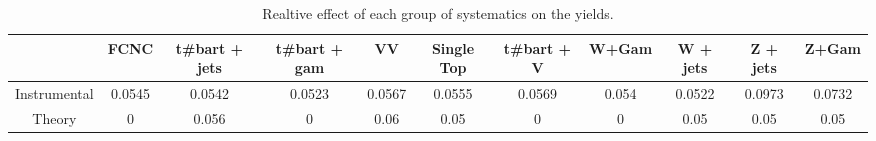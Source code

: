 \begin{table}[htbp]
\begin{center}
\begin{tabular}{|c|c|c|c|c|c|c|c|c|c|c|}
\hline 
      & FCNC      & t#bar{t} + jets      & t#bar{t} +  gam      & VV      & Single Top      & t#bar{t} + V      & W+Gam      & W + jets      & Z + jets      & Z+Gam \\ 
\hline 
 Instrumental & 0.0545 & 0.0542 & 0.0523 & 0.0567 & 0.0555 & 0.0569 & 0.054 & 0.0522 & 0.0973 & 0.0732 \\ 
 Theory & 0 & 0.056 & 0 & 0.06 & 0.05 & 0 & 0 & 0.05 & 0.05 & 0.05 \\ 
\hline 
\end{tabular} 
\caption{Realtive effect of each group of systematics on the yields.} 
\end{center} 
\end{table} 
